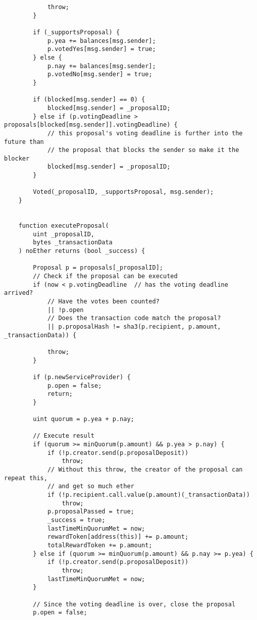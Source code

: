 \documentclass[9pt,oneside]{amsart}
\begin{document}
\begin{appendix}
\begin{verbatim}
            throw;
        }

        if (_supportsProposal) {
            p.yea += balances[msg.sender];
            p.votedYes[msg.sender] = true;
        } else {
            p.nay += balances[msg.sender];
            p.votedNo[msg.sender] = true;
        }

        if (blocked[msg.sender] == 0) {
            blocked[msg.sender] = _proposalID;
        } else if (p.votingDeadline > proposals[blocked[msg.sender]].votingDeadline) {
            // this proposal's voting deadline is further into the future than
            // the proposal that blocks the sender so make it the blocker
            blocked[msg.sender] = _proposalID;
        }

        Voted(_proposalID, _supportsProposal, msg.sender);
    }


    function executeProposal(
        uint _proposalID,
        bytes _transactionData
    ) noEther returns (bool _success) {

        Proposal p = proposals[_proposalID];
        // Check if the proposal can be executed
        if (now < p.votingDeadline  // has the voting deadline arrived?
            // Have the votes been counted?
            || !p.open
            // Does the transaction code match the proposal?
            || p.proposalHash != sha3(p.recipient, p.amount, _transactionData)) {

            throw;
        }

        if (p.newServiceProvider) {
            p.open = false;
            return;
        }

        uint quorum = p.yea + p.nay;

        // Execute result
        if (quorum >= minQuorum(p.amount) && p.yea > p.nay) {
            if (!p.creator.send(p.proposalDeposit))
                throw;
            // Without this throw, the creator of the proposal can repeat this,
            // and get so much ether
            if (!p.recipient.call.value(p.amount)(_transactionData))
                throw;
            p.proposalPassed = true;
            _success = true;
            lastTimeMinQuorumMet = now;
            rewardToken[address(this)] += p.amount;
            totalRewardToken += p.amount;
        } else if (quorum >= minQuorum(p.amount) && p.nay >= p.yea) {
            if (!p.creator.send(p.proposalDeposit))
                throw;
            lastTimeMinQuorumMet = now;
        }

        // Since the voting deadline is over, close the proposal
        p.open = false;


\end{verbatim}
\end{appendix}
\end{document}
